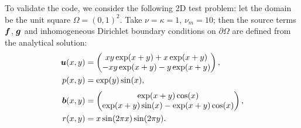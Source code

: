 To validate the code, we consider the following 2D test problem: let the domain be the unit square $\Omega = (0, 1)^2$. Take $\nu = \kappa =1$, $\nu_m=10$; then the source terms $\boldsymbol f$, $\boldsymbol g$ and inhomogeneous Dirichlet boundary conditions on $\partial \Omega$ are defined from the analytical solution:
\begin{align*} \nonumber
\boldsymbol u(x,y)& =\begin{pmatrix}
xy\exp(x + y) + x\exp(x + y)\\
-xy\exp(x + y) - y\exp(x + y)
\end{pmatrix},\\
p(x,y)& =\exp(y)\sin(x),\\[0.1cm]
\boldsymbol b(x,y)& =\begin{pmatrix}
 \exp(x + y)\cos(x) \\
 \exp(x + y)\sin(x) - \exp(x + y)\cos(x)
\end{pmatrix},\\
 r(x,y)& =x\sin(2\pi x)\sin(2\pi y).
\end{align*}



